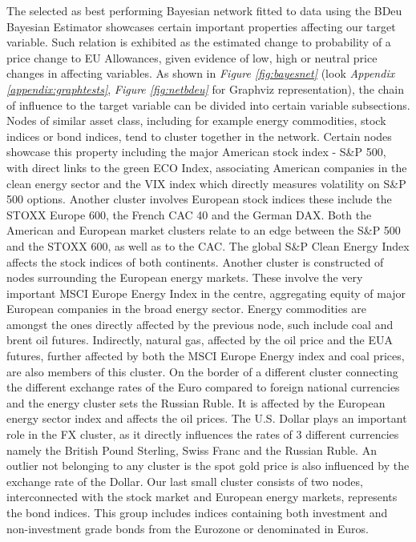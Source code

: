 \documentclass[12pt, letterpaper]{article}
\begin{document}
The selected as best performing Bayesian network fitted to data using the BDeu Bayesian Estimator showcases certain important properties affecting our target variable. Such relation is exhibited as the estimated change to probability of a price change to EU Allowances, given evidence of low, high or neutral price changes in affecting variables. As shown in \textit{Figure \ref{fig:bayesnet}} (look \textit{Appendix \ref{appendix:graphtests}}, \textit{Figure \ref{fig:netbdeu}} for Graphviz representation), the chain of influence to the target variable can be divided into certain variable subsections. Nodes of similar asset class, including for example energy commodities, stock indices or bond indices, tend to cluster together in the network. Certain nodes showcase this property including the major American stock index - S\&P 500, with direct links to the green ECO Index, associating American companies in the clean energy sector and the VIX index which directly measures volatility on S\&P 500 options. Another cluster involves European stock indices these include the STOXX Europe 600, the French CAC 40 and the German DAX. Both the American and European market clusters relate to an edge between the S\&P 500 and the STOXX 600, as well as to the CAC. The global S\&P Clean Energy Index affects the stock indices of both continents. Another cluster is constructed of nodes surrounding the European energy markets. These involve the very important MSCI Europe Energy Index in the centre, aggregating equity of major European companies in the broad energy sector. Energy commodities are amongst the ones directly affected by the previous node, such include coal and brent oil futures. Indirectly, natural gas, affected by the oil price and the EUA futures, further affected by both the MSCI Europe Energy index and coal prices, are also members of this cluster. On the border of a different cluster connecting the different exchange rates of the Euro compared to foreign national currencies and the energy cluster sets the Russian Ruble. It is affected by the European energy sector index and affects the oil prices. The U.S. Dollar plays an important role in the FX cluster, as it directly influences the rates of 3 different currencies namely the British Pound Sterling, Swiss Franc and the Russian Ruble. An outlier not belonging to any cluster is the spot gold price is also influenced by the exchange rate of the Dollar. Our last small cluster consists of two nodes, interconnected with the stock market and European energy markets, represents the bond indices. This group includes indices containing both investment and non-investment grade bonds from the Eurozone or denominated in Euros.
\end{document}
